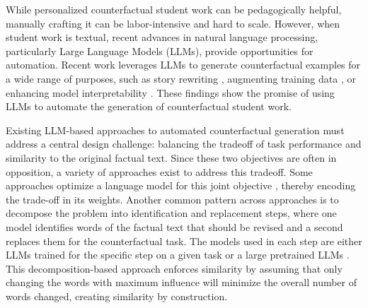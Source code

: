 \documentclass[letterpaper]{article} %
\begin{document}
While personalized counterfactual student work can be pedagogically helpful, manually crafting it can be labor-intensive and hard to scale. However, when student work is textual, recent advances in natural language processing, particularly Large Language Models (LLMs), provide opportunities for automation. Recent work leverages LLMs to generate counterfactual examples for a wide range of purposes, such as story rewriting \cite{chen_unsupervised_2022}, augmenting training data \cite{qiu_paircfr_2024, zhang_dually_2025}, or enhancing model interpretability \cite{ross-etal-2021-explaining}. These findings show the promise of using LLMs to automate the generation of counterfactual student work. 



Existing LLM-based approaches to automated counterfactual generation must address a central design challenge: balancing the tradeoff of task performance and similarity to the original factual text. Since these two objectives are often in opposition, a variety of approaches exist to address this tradeoff. Some approaches optimize a language model for this joint objective \cite{jung_counterfactual_2022,hu_causal_2021,dathathri_plug_2019}, thereby encoding the trade-off in its weights. Another common pattern across approaches is to decompose the problem into identification and replacement steps, where one model identifies words of the factual text that should be revised and a second replaces them for the counterfactual task. The models used in each step are either LLMs trained for the specific step on a given task \cite{ross-etal-2021-explaining,treviso_crest_2023} or a large pretrained LLMs \cite{chen_disco_2023, dixit_core_2022, sachdeva_catfood_2024, wang_fitcf_2025}. This decomposition-based approach enforces similarity by assuming that only changing the words with maximum influence will minimize the overall number of words changed, creating similarity by construction. 
\end{document}
